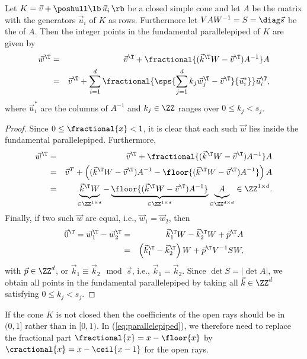 \begin{lemma}
\label{l:fundamental}
Let $K = \vec v + \poshull \lb\, \vec u_i \,\rb$ be a closed simple cone
and let $A$ be the matrix with the generators $\vec u_i$ of $K$
as rows.
Furthermore let $V A W^{-1} = S = \diag \vec s$ be the  of $A$.
Then the integer points in the fundamental parallelepiped of $K$ are given
by
\begin{eqnarray}
\label{eq:parallelepiped}
\vec w^\T & = & \vec v^\T + \fractional{(\vec k^\T W - \vec v^\T) A^{-1}} A
\\
\nonumber
& = &
\vec v^\T +
\sum_{i=1}^d
    \fractional{\sps{\sum_{j=1}^d k_j \vec w^\T_j - \vec v^\T}{\vec u^*_i}}
	\vec u_i^\T,
\end{eqnarray}
where $\vec u^*_i$ are the columns of $A^{-1}$ and $k_j \in \ZZ$ ranges
over $0 \le k_j < s_j$.
\end{lemma}

\begin{proof}
Since $0 \le \fractional{x} < 1$, it is clear that each such $\vec w$
lies inside the fundamental parallelepiped.
Furthermore,
\begin{eqnarray*}
\vec w^\T & = & \vec v^\T + \fractional{(\vec k^\T W - \vec v^\T) A^{-1}} A
\\
& = &
\vec v^T + 
\left(
(\vec k^\T W - \vec v^\T) A^{-1} - \floor{(\vec k^\T W - \vec v^\T) A^{-1}}
\right) A
\\
& = &
\underbrace{\vec k^\T W\mathstrut}_{\in \ZZ^{1\times d}}
-
\underbrace{\floor{(\vec k^\T W - \vec v^\T) A^{-1}}}_{\in \ZZ^{1\times d}}
\underbrace{A\mathstrut}_{\in \ZZ^{d\times d}} \in \ZZ^{1\times d}.
\end{eqnarray*}
Finally, if two such $\vec w$ are equal, i.e., $\vec w_1 = \vec w_2$,
then
\begin{eqnarray*}
\vec 0^\T = \vec w_1^\T - \vec w_2^\T
& = & \vec k_1^\T W - \vec k_2^\T W + \vec p^\T A
\\
& = & \left(\vec k_1^\T - \vec k_2^\T \right) W + \vec p^\T V^{-1} S W,
\end{eqnarray*}
with $\vec p \in \ZZ^d$,
or $\vec k_1 \equiv \vec k_2 \mod \vec s$, i.e., $\vec k_1 = \vec k_2$.
Since $\det S = \vert\det A\vert$, we obtain all points in the fundamental parallelepiped
by taking all $\vec k \in \ZZ^d$ satisfying $0 \le k_j < s_j$.
\end{proof}

If the cone $K$ is not closed then the coefficients of the open rays
should be in $(0,1]$ rather than in $[0,1)$.
In (\ref{eq:parallelepiped}),
we therefore need to replace the fractional part $\fractional{x} = x - \floor{x}$
by $\cractional{x} = x - \ceil{x-1}$ for the open rays.

